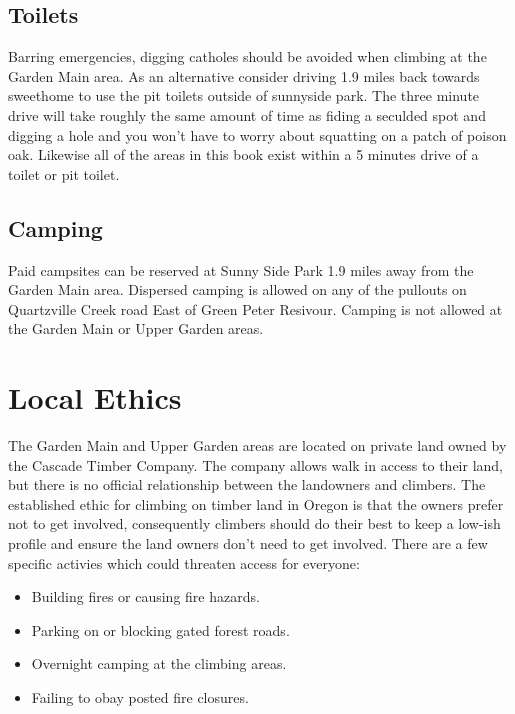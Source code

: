 \subsection*{Toilets}
Barring emergencies, digging catholes should be avoided when climbing at the Garden Main area. As an alternative consider driving 1.9 miles back towards sweethome to use the pit toilets outside of sunnyside park. The three minute drive will take roughly the same amount of time as fiding a seculded spot and digging a hole and you won't have to worry about squatting on a patch of poison oak. Likewise all of the areas in this book exist within a 5 minutes drive of a toilet or pit toilet. 
\subsection*{Camping}
Paid campsites can be reserved at Sunny Side Park 1.9 miles away from the Garden Main area. Dispersed camping is allowed on any of the pullouts on Quartzville Creek road East of Green Peter Resivour. Camping is not allowed at the Garden Main or Upper Garden areas.
\section{Local Ethics}
The Garden Main and Upper Garden areas are located on private land owned by the Cascade Timber Company. The company allows walk in access to their land, but there is no official relationship between the landowners and climbers. The established ethic for climbing on timber land in Oregon is that the owners prefer not to get involved, consequently climbers should do their best to keep a low-ish profile and ensure the land owners don't need to get involved. There are a few specific activies which could threaten access for everyone:\\
\begin{itemize}
\item Building fires or causing fire hazards.\\
\item Parking on or blocking gated forest roads.\\
\item Overnight camping at the climbing areas.\\
\item Failing to obay posted fire closures.\\
\end{itemize}
